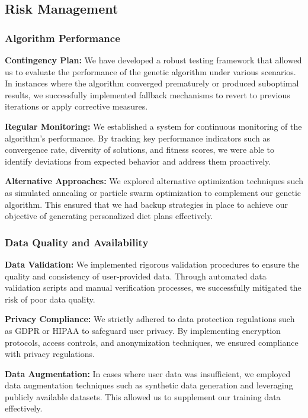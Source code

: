 \documentclass[a4paper,12pt]{article}
\begin{document}
\subsection{Risk Management}
\subsubsection{Algorithm Performance}

\textbf{Contingency Plan:} We have developed a robust testing framework that allowed us to evaluate the performance of the genetic algorithm under various scenarios. In instances where the algorithm converged prematurely or produced suboptimal results, we successfully implemented fallback mechanisms to revert to previous iterations or apply corrective measures.

\noindent\textbf{Regular Monitoring:} We established a system for continuous monitoring of the algorithm's performance. By tracking key performance indicators such as convergence rate, diversity of solutions, and fitness scores, we were able to identify deviations from expected behavior and address them proactively.

\noindent\textbf{Alternative Approaches:} We explored alternative optimization techniques such as simulated annealing or particle swarm optimization to complement our genetic algorithm. This ensured that we had backup strategies in place to achieve our objective of generating personalized diet plans effectively.
\subsubsection{Data Quality and Availability}

\textbf{Data Validation:} We implemented rigorous validation procedures to ensure the quality and consistency of user-provided data. Through automated data validation scripts and manual verification processes, we successfully mitigated the risk of poor data quality.

\noindent\textbf{Privacy Compliance:} We strictly adhered to data protection regulations such as GDPR or HIPAA to safeguard user privacy. By implementing encryption protocols, access controls, and anonymization techniques, we ensured compliance with privacy regulations.

\noindent\textbf{Data Augmentation:} In cases where user data was insufficient, we employed data augmentation techniques such as synthetic data generation and leveraging publicly available datasets. This allowed us to supplement our training data effectively.
\end{document}
